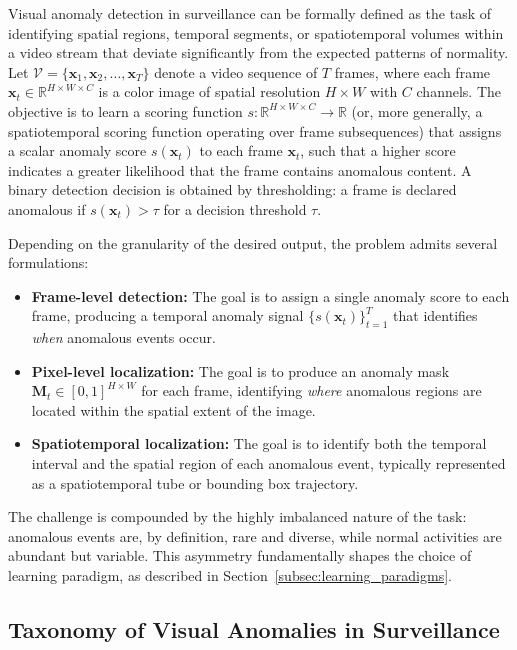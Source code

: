 \documentclass[10pt,a4paper]{article}
\begin{document}
Visual anomaly detection in surveillance can be formally defined as the task of identifying spatial regions, temporal segments, or spatiotemporal volumes within a video stream that deviate significantly from the expected patterns of normality. Let $\mathcal{V} = \{\mathbf{x}_1, \mathbf{x}_2, \ldots, \mathbf{x}_T\}$ denote a video sequence of $T$ frames, where each frame $\mathbf{x}_t \in \mathbb{R}^{H \times W \times C}$ is a color image of spatial resolution $H \times W$ with $C$ channels. The objective is to learn a scoring function $s: \mathbb{R}^{H \times W \times C} \rightarrow \mathbb{R}$ (or, more generally, a spatiotemporal scoring function operating over frame subsequences) that assigns a scalar anomaly score $s(\mathbf{x}_t)$ to each frame $\mathbf{x}_t$, such that a higher score indicates a greater likelihood that the frame contains anomalous content. A binary detection decision is obtained by thresholding: a frame is declared anomalous if $s(\mathbf{x}_t) > \tau$ for a decision threshold $\tau$.

Depending on the granularity of the desired output, the problem admits several formulations:

\begin{itemize}
    \item \textbf{Frame-level detection:} The goal is to assign a single anomaly score to each frame, producing a temporal anomaly signal $\{s(\mathbf{x}_t)\}_{t=1}^{T}$ that identifies \textit{when} anomalous events occur.

    \item \textbf{Pixel-level localization:} The goal is to produce an anomaly mask $\mathbf{M}_t \in [0,1]^{H \times W}$ for each frame, identifying \textit{where} anomalous regions are located within the spatial extent of the image.

    \item \textbf{Spatiotemporal localization:} The goal is to identify both the temporal interval and the spatial region of each anomalous event, typically represented as a spatiotemporal tube or bounding box trajectory.
\end{itemize}

The challenge is compounded by the highly imbalanced nature of the task: anomalous events are, by definition, rare and diverse, while normal activities are abundant but variable. This asymmetry fundamentally shapes the choice of learning paradigm, as described in Section~\ref{subsec:learning_paradigms}.


\subsection{Taxonomy of Visual Anomalies in Surveillance}
\label{subsec:anomaly_taxonomy}
\end{document}
